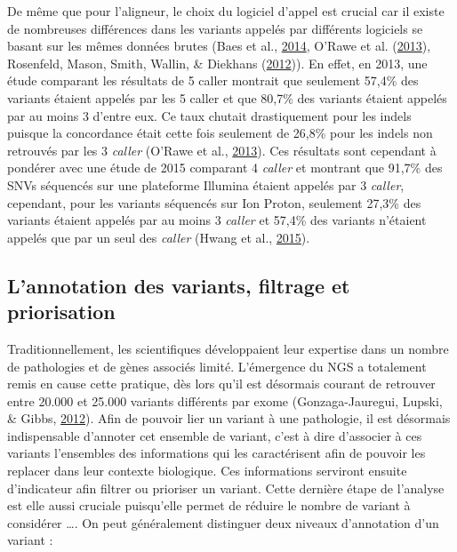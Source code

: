 \documentclass[12pt,twoside]{reedthesis}
\theoremstyle{definition}
\theoremstyle{definition}
\theoremstyle{remark}
\begin{document}
  De même que pour l'aligneur, le choix du logiciel d'appel est crucial
  car il existe de nombreuses différences dans les variants appelés par
  différents logiciels se basant sur les mêmes données brutes (Baes et
  al., \protect\hyperlink{ref-Baes2014}{2014}, O'Rawe et al.
  (\protect\hyperlink{ref-ORawe2013}{2013}), Rosenfeld, Mason, Smith,
  Wallin, \& Diekhans (\protect\hyperlink{ref-Rosenfeld2012}{2012})). En
  effet, en 2013, une étude comparant les résultats de 5 caller montrait
  que seulement 57,4\% des variants étaient appelés par les 5 caller et
  que 80,7\% des variants étaient appelés par au moins 3 d'entre eux. Ce
  taux chutait drastiquement pour les indels puisque la concordance était
  cette fois seulement de 26,8\% pour les indels non retrouvés par les 3
  \emph{caller} (O'Rawe et al., \protect\hyperlink{ref-ORawe2013}{2013}).
  Ces résultats sont cependant à pondérer avec une étude de 2015 comparant
  4 \emph{caller} et montrant que 91,7\% des SNVs séquencés sur une
  plateforme Illumina étaient appelés par 3 \emph{caller}, cependant, pour
  les variants séquencés sur Ion Proton, seulement 27,3\% des variants
  étaient appelés par au moins 3 \emph{caller} et 57,4\% des variants
  n'étaient appelés que par un seul des \emph{caller} (Hwang et al.,
  \protect\hyperlink{ref-Hwang2015}{2015}).
  
  \subsection{L'annotation des variants, filtrage et
  priorisation}\label{lannotation-des-variants-filtrage-et-priorisation}
  
  Traditionnellement, les scientifiques développaient leur expertise dans
  un nombre de pathologies et de gènes associés limité. L'émergence du NGS
  a totalement remis en cause cette pratique, dès lors qu'il est désormais
  courant de retrouver entre 20.000 et 25.000 variants différents par
  exome (Gonzaga-Jauregui, Lupski, \& Gibbs,
  \protect\hyperlink{ref-Gonzaga-Jauregui2012}{2012}). Afin de pouvoir
  lier un variant à une pathologie, il est désormais indispensable
  d'annoter cet ensemble de variant, c'est à dire d'associer à ces
  variants l'ensembles des informations qui les caractérisent afin de
  pouvoir les replacer dans leur contexte biologique. Ces informations
  serviront ensuite d'indicateur afin filtrer ou prioriser un variant.
  Cette dernière étape de l'analyse est elle aussi cruciale puisqu'elle
  permet de réduire le nombre de variant à considérer \ldots{}. On peut
  généralement distinguer deux niveaux d'annotation d'un variant :
  
\end{document}
